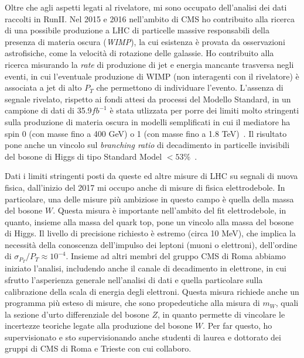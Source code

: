 \documentclass[a4paper,12pt,twoside]{article}
\begin{document}
{  Oltre che agli aspetti legati al rivelatore, mi sono occupato
  dell'analisi dei dati raccolti in RunII. Nel 2015 e 2016 nell'ambito
  di CMS ho contribuito alla ricerca di una possibile produzione a LHC
  di particelle massive responsabili della presenza di materia oscura
  ({\it WIMP}), la cui esistenza \`e provata da osservazioni
  astrofisiche, come la velocit\`a di rotazione delle galassie. Ho
  contribuito alla ricerca misurando la {\it rate} di produzione di
  jet e energia mancante trasversa negli eventi, in cui l'eventuale
  produzione di WIMP (non interagenti con il rivelatore) \`e associata
  a jet di alto $P_T$ che permettono di individuare l'evento.
  L'assenza di segnale rivelato, rispetto ai fondi attesi da processi
  del Modello Standard, in un campione di dati di 35.9$fb^{-1}$ \`e
  stata utlizzata per porre dei limiti molto stringenti sulla
  produzione di materia oscura in modelli semplificati in cui il
  mediatore ha spin 0 (con masse fino a 400 GeV) o 1 (con masse fino a
  1.8 TeV)~.  Il risultato pone anche un
  vincolo sul {\it branching ratio} di decadimento in particelle
  invisibili del bosone di Higgs di tipo Standard Model
  $<53$\%~.
  
  Dati i limiti stringenti posti da queste ed altre misure di LHC su
  segnali di nuova fisica, dall'inizio del 2017 mi occupo anche di
  misure di fisica elettrodebole. In particolare, una delle misure
  pi\`u ambiziose in questo campo \`e quella della massa del bosone
  $W$. Questa misura \`e importante nell'ambito del fit elettrodebole,
  in quanto, insieme alla massa del quark top, pone un vincolo alla
  massa del bosone di Higgs. Il livello di precisione richiesto \`e
  estremo (circa 10 MeV), che implica la necessit\`a della conoscenza
  dell'impulso dei leptoni (muoni o elettroni), dell'ordine di
  $\sigma_{P_T}/P_T \approx 10^{-4}$. Insieme ad altri membri del
  gruppo CMS di Roma abbiamo iniziato l'analisi, includendo anche il
  canale di decadimento in elettrone, in cui sfrutto l'asperienza
  generale nell'analisi di dati e quella particolare sulla
  calibrazione della scala di energia degli elettroni.  Questa misura
  richiede anche un programma pi\`u esteso di misure, che sono
  propedeutiche alla misura di $m_W$, quali la sezione d'urto
  differenziale del bosone $Z$, in quanto permette di vincolare le
  incertezze teoriche legate alla produzione del bosone $W$. Per far
  questo, ho supervisionato e sto supervisionando anche studenti di
  laurea e dottorato dei gruppi di CMS di Roma e Trieste con cui
  collaboro.

}
\end{document}
